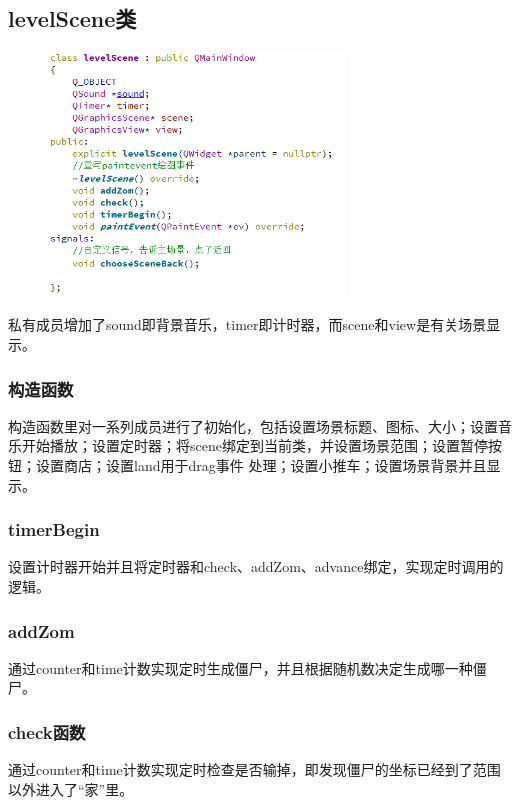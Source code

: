 \documentclass[12pt,a4paper,UTF8]{article}
\begin{document}
    \subsection{levelScene类}
    \begin{figure}[H]
      \centering
    \includegraphics[width=0.7\textwidth]{figure/levelScene.png}
    \end{figure}
    私有成员增加了sound即背景音乐，timer即计时器，而scene和view是有关场景显示。\\
    \subsubsection{构造函数}
    构造函数里对一系列成员进行了初始化，包括设置场景标题、图标、大小；设置音乐开始播放；设置定时器；将scene绑定到当前类，并设置场景范围；设置暂停按钮；设置商店；设置land用于drag事件
    处理；设置小推车；设置场景背景并且显示。
    \subsubsection{timerBegin}
    设置计时器开始并且将定时器和check、addZom、advance绑定，实现定时调用的逻辑。
    \subsubsection{addZom}
    通过counter和time计数实现定时生成僵尸，并且根据随机数决定生成哪一种僵尸。
    \subsubsection{check函数}
    通过counter和time计数实现定时检查是否输掉，即发现僵尸的坐标已经到了范围以外进入了“家”里。
\end{document}
